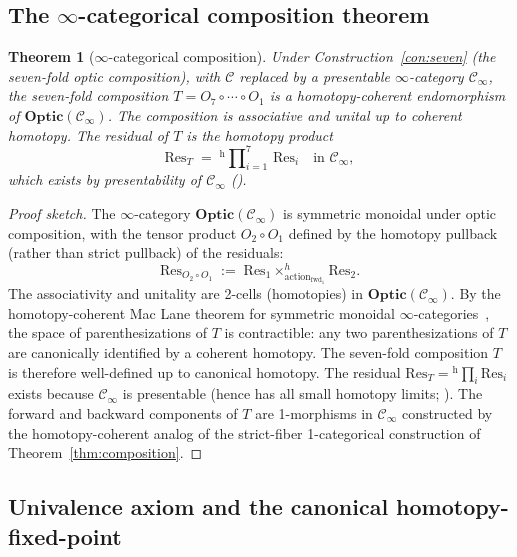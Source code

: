 \documentclass[11pt,a4paper]{article}
\theoremstyle{plain}
\newtheorem{theorem}{Theorem}[section]
\theoremstyle{definition}
\theoremstyle{remark}
\newcommand{\Optic}{\mathbf{Optic}}
\begin{document}
\subsection{The $\infty$-categorical composition theorem}

\begin{theorem}[$\infty$-categorical composition]
\label{thm:hott-composition}
Under Construction~\ref{con:seven} (the seven-fold optic composition),
with $\mathcal{C}$ replaced by a presentable $\infty$-category
$\mathcal{C}_\infty$, the seven-fold composition $T = O_7 \circ \cdots
\circ O_1$ is a homotopy-coherent endomorphism of
$\Optic(\mathcal{C}_\infty)$. The composition is associative and
unital up to coherent homotopy. The residual of $T$ is the homotopy
product
\[
\mathrm{Res}_T \;=\; {}^{\mathrm{h}}\!\prod\nolimits_{i=1}^{7}\,\mathrm{Res}_i
\quad \text{in } \mathcal{C}_\infty,
\]
which exists by presentability of $\mathcal{C}_\infty$
(\cite[Proposition~5.5.3.1]{lurie2009htt}).
\end{theorem}

\begin{proof}[Proof sketch]
The $\infty$-category $\Optic(\mathcal{C}_\infty)$ is symmetric
monoidal under optic composition, with the tensor product $O_2 \circ
O_1$ defined by the homotopy pullback (rather than strict pullback) of
the residuals:
\[
\mathrm{Res}_{O_2 \circ O_1} \;:=\;
\mathrm{Res}_1 \times^h_{\mathrm{action}_{\mathrm{fwd}_1}} \mathrm{Res}_2.
\]
The associativity and unitality are 2-cells (homotopies) in
$\Optic(\mathcal{C}_\infty)$. By the homotopy-coherent Mac Lane theorem
for symmetric monoidal $\infty$-categories~\cite[Theorem~2.4.3]
{lurie2017ha}, the space of parenthesizations of $T$ is contractible:
any two parenthesizations of $T$ are canonically identified by a
coherent homotopy. The seven-fold composition $T$ is therefore
well-defined up to canonical homotopy. The residual
$\mathrm{Res}_T = {}^{\mathrm{h}}\!\prod_i \mathrm{Res}_i$ exists because
$\mathcal{C}_\infty$ is presentable (hence has all small homotopy
limits; \cite[Proposition~5.5.3.1]{lurie2009htt}). The forward and
backward components of $T$ are 1-morphisms in $\mathcal{C}_\infty$
constructed by the homotopy-coherent analog of the strict-fiber
1-categorical construction of Theorem~\ref{thm:composition}.
\end{proof}

\subsection{Univalence axiom and the canonical homotopy-fixed-point}
\end{document}
